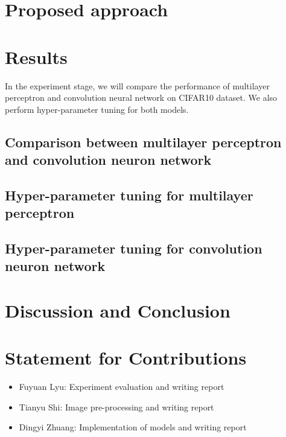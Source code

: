\documentclass[11pt]{scrartcl}
\begin{document}
\section{Proposed approach}


\section{Results}
In the experiment stage, we will compare the performance of multilayer perceptron and convolution neural network on CIFAR10 dataset\cite{krizhevsky2009learning}. We also perform hyper-parameter tuning for both models.

\subsection{Comparison between multilayer perceptron and convolution neuron network}




\subsection{Hyper-parameter tuning for multilayer perceptron}

\subsection{Hyper-parameter tuning for convolution neuron network}

\section{Discussion and Conclusion}

\section{Statement for Contributions}
\begin{itemize}
	\item Fuyuan Lyu: Experiment evaluation and writing report
	\item Tianyu Shi: Image pre-processing and writing report
	\item Dingyi Zhuang: Implementation of models and writing report
\end{itemize}
\newpage



\end{document}
